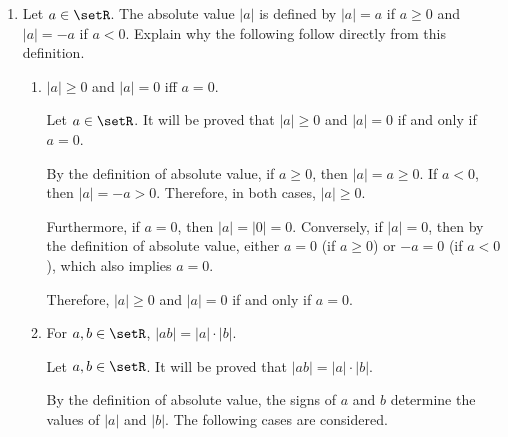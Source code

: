 \begin{enumerate}
\begin{enumerate}
\begin{subprove}
      Therefore, it must be that \(0 < a^{-1}\).
    \end{subprove}
    \item If \(0<a<b\), then \(0<b^{-1}<a^{-1}\).
    \begin{subprove}
      Let \(a, b \in \setR\) such that \(0 < a < b\).
      It will be proved that \(0 < b^{-1} < a^{-1}\).
      
      By the previous result, since \(0 < b\), it follows that \(0 < b^{-1}\).
      Since \(a < b\), by multiplying both sides of the inequality \(a < b\) by \(b^{-1}\) (which is positive), it follows that \(a b^{-1} < 1\).
      By multiplying both sides of the inequality \(a b^{-1} < 1\) by \(a^{-1}\) (which is positive), it follows that \(b^{-1} < a^{-1}\).
      
      Therefore, if \(0 < a < b\), then \(0 < b^{-1} < a^{-1}\).
    \end{subprove}
  \end{enumerate}

  \item Let \(a\in\setR\). The absolute value \(|a|\) is defined by \(|a|=a\) if \(a\ge0\) and \(|a|=-a\) if \(a<0\). Explain why the following follow directly from this definition.
  \begin{enumerate}
    \item \(|a|\ge0\) and \(|a|=0\) iff \(a=0\).
    \begin{subprove}
      Let \(a \in \setR\).
      It will be proved that \(|a| \ge 0\) and \(|a| = 0\) if and only if \(a = 0\).
      
      By the definition of absolute value, if \(a \ge 0\), then \(|a| = a \ge 0\).
      If \(a < 0\), then \(|a| = -a > 0\).
      Therefore, in both cases, \(|a| \ge 0\).
      
      Furthermore, if \(a = 0\), then \(|a| = |0| = 0\).
      Conversely, if \(|a| = 0\), then by the definition of absolute value, either \(a = 0\) (if \(a \ge 0\)) or \(-a = 0\) (if \(a < 0\)), which also implies \(a = 0\).
      
      Therefore, \(|a| \ge 0\) and \(|a| = 0\) if and only if \(a = 0\).
    \end{subprove}
    \item For \(a,b\in\setR\), \(|ab|=|a|\cdot|b|\).
    \begin{subprove}
      Let \(a, b \in \setR\).
      It will be proved that \(|ab| = |a| \cdot |b|\).
      
      By the definition of absolute value, the signs of \(a\) and \(b\) determine the values of \(|a|\) and \(|b|\).
      The following cases are considered.
      

\end{subprove}
\end{enumerate}
\end{enumerate}
